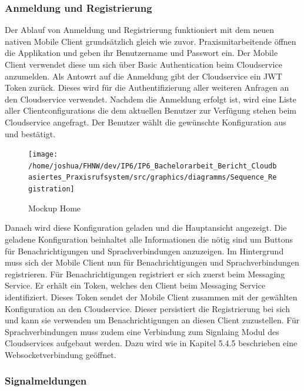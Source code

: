 \clearpage

\subsubsection{Anmeldung und Registrierung}

Der Ablauf von Anmeldung und Registrierung funktioniert mit dem neuen nativen Mobile Client grundsätzlich gleich wie zuvor.
Praxismitarbeitende öffnen die Applikation und geben ihr Benutzername und Passwort ein.
Der Mobile Client verwendet diese um sich über Basic Authentication beim Cloudservice anzumelden.
Als Antowrt auf die Anmeldung gibt der Cloudservice ein JWT Token zurück.
Dieses wird für die Authentifizierung aller weiteren Anfragen an den Cloudservice verwendet.
Nachdem die Anmeldung erfolgt ist, wird eine Liste aller Clientconfigurations die dem aktuellen Benutzer zur Verfügung stehen beim Cloudservice angefragt.
Der Benutzer wählt die gewünschte Konfiguration aus und bestätigt.

\begin{figure}[h]
    \centering
    \begin{minipage}[b]{0.9\textwidth}
        \texttt{[image: /home/joshua/FHNW/dev/IP6/IP6\_Bachelorarbeit\_Bericht\_Cloudbasiertes\_Praxisrufsystem/src/graphics/diagramms/Sequence\_Registration]}
        \caption{Mockup Home}
    \end{minipage}
\end{figure}

Danach wird diese Konfiguration geladen und die Hauptansicht angezeigt.
Die geladene Konfiguration beinhaltet alle Informationen die nötig sind um Buttons für Benachrichtigungen und Sprachverbindungen anzuzeigen.
Im Hintergrund muss sich der Mobile Client nun für Benachrichtigungen und Sprachverbindungen registrieren.
Für Benachrichtigungen registriert er sich zuerst beim Messaging Service.
Er erhält ein Token, welches den Client beim Messaging Service identifiziert.
Dieses Token sendet der Mobile Client zusammen mit der gewählten Konfiguration an den Cloudservice.
Dieser persistiert die Registrierung bei sich und kann sie verwenden um Benachrichtigungen an diesen Client zuzustellen.
Für Sprachverbindungen muss zudem eine Verbindung zum Signlaing Modul des Cloudservices aufgebaut werden.
Dazu wird wie in Kapitel 5.4.5 beschrieben eine Websocketverbindung geöffnet.

\clearpage
\subsubsection{Signalmeldungen}

